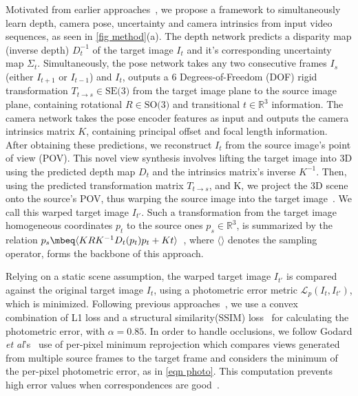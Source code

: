 \documentclass{bmvc2k}
\def\etal{\emph{et al}\bmvaOneDot}
\begin{document}
Motivated from earlier approaches~\cite{godard2019digging,gordon2019depth}, we propose a framework to simultaneously learn depth, camera pose, uncertainty and camera intrinsics from input video sequences, as seen in \autoref{fig method}(a). The depth network predicts a disparity map (inverse depth) $D_t^{-1}$ of the target image $I_{t}$ and it's corresponding uncertainty map $\Sigma_t$. Simultaneously, the pose network takes any two consecutive frames $I_s$ (either $I_{t+1}$ or $I_{t-1}$) and $I_t$, outputs a 6 Degrees-of-Freedom (DOF) rigid transformation $T_{t\rightarrow s} \in \text{SE(3)}$ from the target image plane to the source image plane, containing rotational $R \in \text{SO(3)}$ and transitional $t \in \mathbb{R}^3$ information.
The camera network takes the pose encoder features as input and outputs the camera intrinsics matrix $K$, containing principal offset and focal length information. After obtaining these predictions, we reconstruct $I_t$ from the source image's point of view (POV). This novel view synthesis involves lifting the target image into 3D using the predicted depth map $D_t$ and the intrinsics matrix's inverse $K^{-1}$. Then, using the predicted transformation matrix $T_{t\rightarrow s}$, and K, we project the 3D scene onto the source's POV, thus warping the source image into the target image~\cite{zhou2017unsupervised, godard2019digging}. We call this warped target image $I_{t'}$. Such a transformation from the target image homogeneous coordinates $p_t$ to the source ones $p_s \in \mathbb{R}^3$, is summarized by the relation $p_s \mbeq \langle KRK^{-1}D_{t}(p_t)p_t + Kt\rangle$~\cite{zhou2017unsupervised}, where $\langle \rangle$ denotes the sampling operator, forms the backbone of this approach.

Relying on a static scene assumption, the warped target image $I_{t'}$ is compared against the original target image $I_t$, using a photometric error metric $\mathcal{L}_{p}(I_{t}, I_{t'})$, which is minimized. Following previous approaches~\cite{zhou2017unsupervised, godard2019digging}, we use a convex combination of L1 loss and a structural similarity(SSIM) loss~\cite{wang2004image} for calculating the photometric error, with $\alpha=0.85$. In order to handle occlusions, we follow Godard \etal's~\cite{godard2019digging} use of per-pixel minimum reprojection which compares views generated from multiple source frames to the target frame and considers the minimum of the per-pixel photometric error, as in \autoref{eqn photo}. This computation prevents high error values when correspondences are good~\cite{godard2019digging}.
\end{document}
